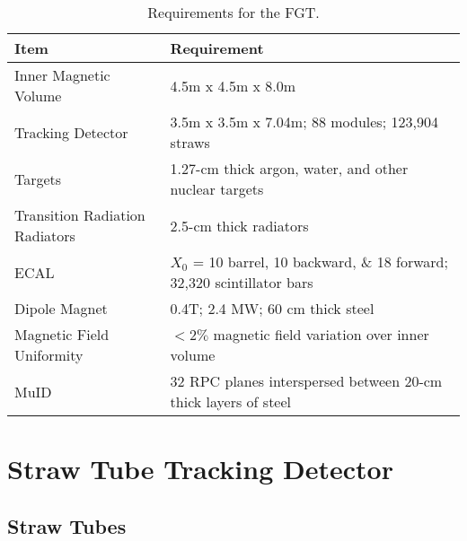 \begin{table}
\centering
  \caption{\label{tab:STT_specs} Requirements for the FGT.}
  \begin{tabular}{| l | l |}
    \hline
Item&Requirement \\
    \hline
Inner Magnetic Volume & 4.5m x 4.5m x 8.0m  \\
Tracking Detector & 3.5m x 3.5m x 7.04m; 88 modules; 123,904 straws \\
Targets & 1.27-cm thick argon, water, and other nuclear targets \\
Transition Radiation Radiators & 2.5-cm thick radiators \\
ECAL & $X_0$ = 10 barrel, 10 backward, \& 18 forward; 32,320 scintillator bars \\
Dipole Magnet & 0.4T; 2.4 MW; 60 cm thick steel \\
Magnetic Field Uniformity & $<2\%$ magnetic field variation over inner volume \\ 
MuID & 32 RPC planes interspersed between 20-cm thick layers of steel \\ 
     \hline
  \end{tabular}
\end{table}

\section{Straw Tube Tracking Detector}

\subsection{Straw Tubes}

